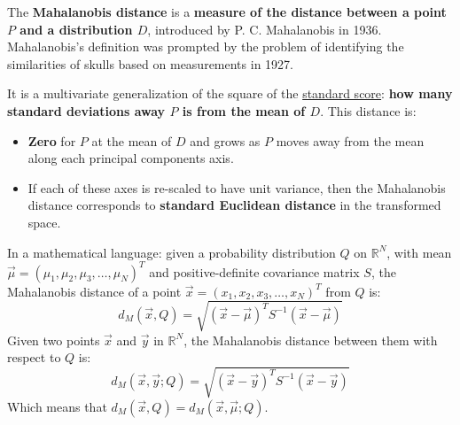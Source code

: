 \documentclass[a4paper]{article}
\newcommand{\definition}[1]{\textcolor{Red3}{\textbf{#1}}\index{#1}}
\newcommand{\highspace}{\vspace{1.2em}\noindent}
\begin{document}
    The \definition{Mahalanobis distance} is a \textbf{measure of the distance between a point $P$ and a distribution $D$}, introduced by P. C. Mahalanobis in 1936. Mahalanobis's definition was prompted by the problem of identifying the similarities of skulls based on measurements in 1927.

    \highspace
    It is a multivariate generalization of the square of the \href{https://en.wikipedia.org/wiki/Standard_score}{standard score}: \textbf{how many standard deviations away $P$ is from the mean of $D$}. This distance is:
    \begin{itemize}
        \item \textbf{Zero} for $P$ at the mean of $D$ and grows as $P$ moves away from the mean along each principal components axis.

        \item If each of these axes is re-scaled to have unit variance, then the Mahalanobis distance corresponds to \textbf{standard Euclidean distance} in the transformed space.
    \end{itemize}
    
    \highspace
    In a mathematical language: given a probability distribution $Q$ on $\mathbb{R}^{N}$, with mean $\overset{\rightarrow}{\mu} = \left(\mu_{1}, \mu_{2}, \mu_{3}, \dots, \mu_{N}\right)^{T}$ and positive-definite covariance matrix $S$, the Mahalanobis distance of a point $\overset{\rightarrow}{x} = \left(x_{1}, x_{2}, x_{3}, \dots, x_{N}\right)^{T}$ from $Q$ is:
    \begin{equation}
        d_{M}\left(\overset{\rightarrow}{x}, Q\right) = \sqrt{
            \left(\overset{\rightarrow}{x} - \overset{\rightarrow}{\mu}\right)^{T} S^{-1}\left(\overset{\rightarrow}{x} - \overset{\rightarrow}{\mu}\right)
        }
    \end{equation}
    Given two points $\overset{\rightarrow}{x}$ and $\overset{\rightarrow}{y}$ in $\mathbb{R}^{N}$, the Mahalanobis distance between them with respect to $Q$ is:
    \begin{equation}
        d_{M}\left(\overset{\rightarrow}{x}, \overset{\rightarrow}{y}; Q\right) = \sqrt{
            \left(\overset{\rightarrow}{x} - \overset{\rightarrow}{y}\right)^{T} S^{-1}\left(\overset{\rightarrow}{x} - \overset{\rightarrow}{y}\right)
        }
    \end{equation}
    Which means that $d_{M}\left(\overset{\rightarrow}{x}, Q\right) = d_{M}\left(\overset{\rightarrow}{x}, \overset{\rightarrow}{\mu}; Q\right)$.
\end{document}
